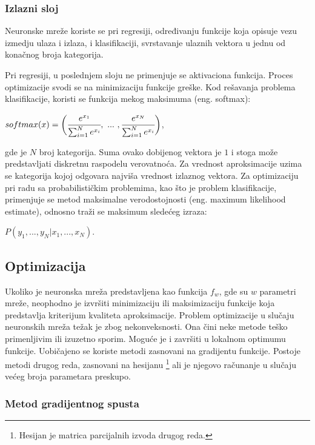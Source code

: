 \subsubsection{Izlazni sloj}

Neuronske mreže koriste se pri regresiji, određivanju funkcije koja opisuje vezu izmedju ulaza i izlaza, i klasifikaciji, svrstavanje ulaznih vektora u jednu od konačnog broja kategorija. \par

Pri regresiji, u poslednjem sloju ne primenjuje se aktivaciona funkcija. Proces optimizacije svodi se na minimizaciju funkcije greške. Kod rešavanja problema klasifikacije, koristi se funkcija mekog maksimuma (eng. softmax):
\begin{center}
	$ softmax(x) = \bigg( \cfrac{e^{x_1}}{\sum_{i=1}^{N} e^{x_i}}, ~...~, \cfrac{e^{x_N}}{\sum_{i=1}^{N} e^{x_i}} \bigg) $, 
\end{center}
gde je $N$ broj kategorija. Suma ovako dobijenog vektora je $1$ i stoga može predstavljati diskretnu raspodelu verovatnoća. Za vrednost aproksimacije uzima se kategorija kojoj odgovara najviša vrednost izlaznog vektora. Za optimizaciju pri radu sa probabilističkim problemima, kao što je problem klasifikacije, primenjuje se metod maksimalne verodostojnosti (eng. maximum likelihood estimate), odnosno traži se maksimum sledećeg izraza: 
\begin{center}
	$P(y_1, ..., y_N | x_1, ..., x_N)$.
\end{center}

\subsection{Optimizacija}
\label{subsec:optimizacija}

Ukoliko je neuronska mreža predstavljena kao funkcija $f_w$, gde su $w$ parametri mreže, neophodno je izvršiti minimizaciju ili maksimizaciju funkcije koja predstavlja kriterijum kvaliteta aproksimacije. Problem optimizacije u slučaju neuronskih mreža težak je zbog nekonveksnosti. Ona čini neke metode teško primenljivim ili izuzetno sporim. Moguće je i završiti u lokalnom optimumu funkcije. Uobičajeno se koriste metodi zasnovani na gradijentu funkcije. Postoje metodi drugog reda, zasnovani na hesijanu \footnote{Hesijan je matrica parcijalnih izvoda drugog reda.} ali je njegovo računanje u slučaju većeg broja parametara preskupo.

\subsubsection{Metod gradijentnog spusta}

